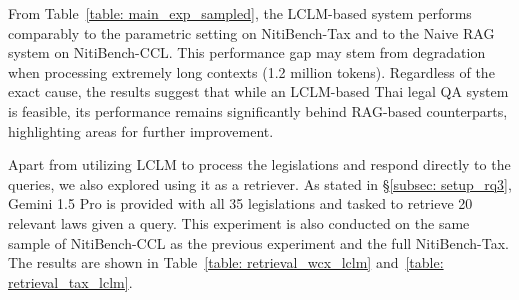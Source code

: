 From Table~\ref{table: main_exp_sampled}, the LCLM-based system performs comparably to the parametric setting on NitiBench-Tax and to the Naive RAG system on NitiBench-CCL. 
%
This performance gap may stem from degradation when processing extremely long contexts (1.2 million tokens). 
%
Regardless of the exact cause, the results suggest that while an LCLM-based Thai legal QA system is feasible, its performance remains significantly behind RAG-based counterparts, highlighting areas for further improvement.

Apart from utilizing LCLM to process the legislations and respond directly to the queries, we also explored using it as a retriever. 
%
As stated in \S\ref{subsec: setup_rq3}, Gemini 1.5 Pro is provided with all 35 legislations and tasked to retrieve 20 relevant laws given a query. 
%
This experiment is also conducted on the same sample of NitiBench-CCL as the previous experiment and the full NitiBench-Tax. 
%
The results are shown in Table~\ref{table: retrieval_wcx_lclm} and~\ref{table: retrieval_tax_lclm}.

